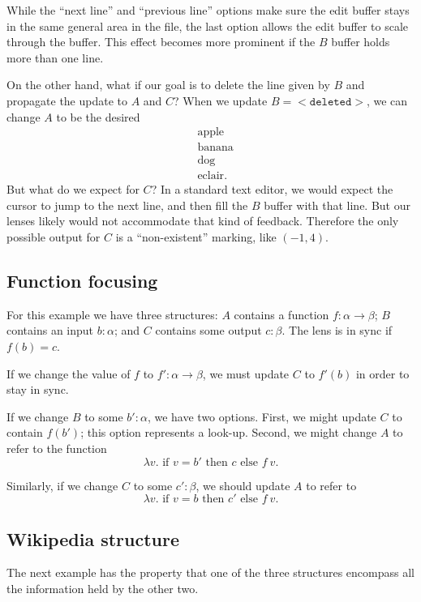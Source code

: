 \documentclass{article}
\begin{document}
While the ``next line'' and ``previous line'' options make sure
the edit buffer stays in the same general area in the file, the
last option allows the edit buffer to scale through the buffer.
This effect becomes more prominent if the $B$ buffer holds
more than one line. 

On the other hand, what if our goal is to delete the line given
by $B$ and propagate the update to $A$ and $C$? When we update
$B = <\texttt{deleted}>$, we can change $A$ to be the desired
\begin{align*}
  &\text{apple} \\
  &\text{banana} \\
  &\text{dog} \\
  &\text{eclair}.
\end{align*}
But what do we expect for $C$? In a standard
text editor, we would expect the cursor to jump to the next line,
and then fill the $B$ buffer with that line. But our lenses
likely would not accommodate that kind of feedback.
Therefore the only possible output
for $C$ is a ``non-existent'' marking, like $(-1,4)$. 

\subsection*{Function focusing}

For this example we have three structures: 
$A$ contains a function $f : \alpha \rightarrow \beta$;
$B$ contains an input $b : \alpha$; and 
$C$ contains some output $c : \beta$. The
lens is in sync if $f(b) = c$. 

If we change the value of $f$ to $f':\alpha \rightarrow \beta$,
we must update $C$ to $f'(b)$ in order to stay in sync. 

If we change $B$ to some $b' : \alpha$, we have two options. 
First, we might update $C$ to contain $f(b')$; this option
represents a look-up. 
Second, we might change $A$ to refer to the function 
\[ \lambda v. \text{ if } v=b' \text{ then } c \text{ else } f~v. \]

Similarly, if we change $C$ to some $c' : \beta$, we should update $A$ to 
refer to 
\[ \lambda v. \text{ if } v=b \text{ then } c' \text{ else } f~v. \]

\subsection*{Wikipedia structure}

The next example has the property that one of the three structures encompass
all the information held by the other two. 
\end{document}

